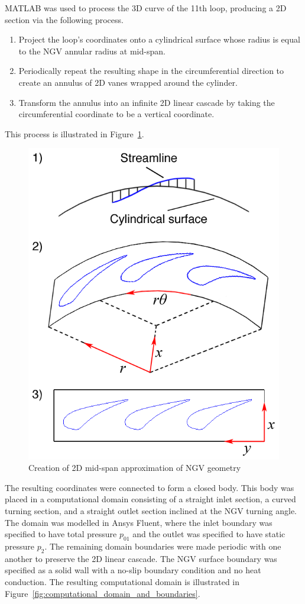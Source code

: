 \documentclass[a4paper, 11pt, oneside]{report}
\begin{document}
MATLAB was used to process the 3D curve of the 11th loop, producing a 2D section via the following process. 
\begin{enumerate}
  \item Project the loop's coordinates onto a cylindrical surface whose radius is equal to the NGV annular radius at mid-span.
  \item Periodically repeat the resulting shape in the circumferential direction to create an annulus of 2D vanes wrapped around the cylinder.
  \item Transform the annulus into an infinite 2D linear cascade by taking the circumferential coordinate to be a vertical coordinate.
\end{enumerate}
This process is illustrated in Figure~\ref{fig:2d_geometry_creation}.

\begin{figure}[H]
	\centering
	\includegraphics[width=.6\textwidth]{figs/2d_geometry_creation.png}
	\caption{Creation of 2D mid-span approximation of NGV geometry}
	\label{fig:2d_geometry_creation}
\end{figure}

The resulting coordinates were connected to form a closed body. This body was placed in a computational domain consisting of a straight inlet section, a curved turning section, and a straight outlet section inclined at the NGV turning angle. The domain was modelled in Ansys Fluent, where the inlet boundary was specified to have total pressure $p_{01}$ and the outlet was specified to have static pressure $p_2$. The remaining domain boundaries were made periodic with one another to preserve the 2D linear cascade. The NGV surface boundary was specified as a solid wall with a no-slip boundary condition and no heat conduction. The resulting computational domain is illustrated in Figure~\ref{fig:computational_domain_and_boundaries}.
\end{document}
